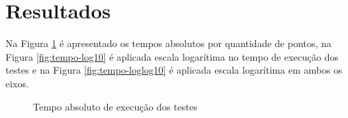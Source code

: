 \documentclass[conference]{IEEEtran}
\begin{document}
\section{Resultados} \label{sec:resultados}
Na Figura \ref{fig:tempo-abs} é apresentado os tempos absolutos por quantidade de pontos, na Figura \ref{fig:tempo-log10} é aplicada escala logarítima no tempo de execução dos testes e na Figura \ref{fig:tempo-loglog10} é aplicada escala logarítima em ambos os eixos.
\begin{figure}[t]
   \hspace{\fill}
   \hspace{\fill}
  \caption{Tempo absoluto de execução dos testes} 
  \label{fig:tempo-abs}
\end{figure}
\end{document}

